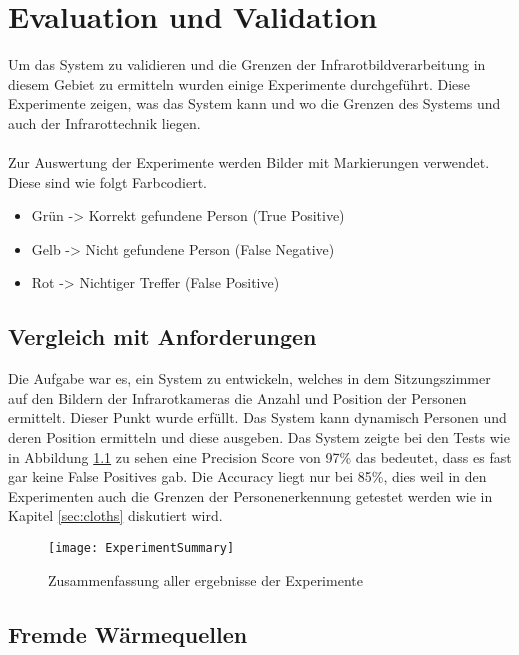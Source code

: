 \chapter{Evaluation und Validation}
\label{ch:Eval}

Um das System zu validieren und die Grenzen der Infrarotbildverarbeitung in diesem Gebiet zu ermitteln wurden einige Experimente durchgeführt. Diese Experimente zeigen, was das System kann und wo die Grenzen des Systems und auch der Infrarottechnik liegen.\\
\\
Zur Auswertung der Experimente werden Bilder mit Markierungen verwendet. Diese sind wie folgt Farbcodiert.

\begin{itemize}
	\item Grün -> Korrekt gefundene Person (True Positive)
	\item Gelb -> Nicht gefundene Person (False Negative)
	\item Rot -> Nichtiger Treffer (False Positive)
\end{itemize}


\section{Vergleich mit Anforderungen}
\label{sec:VergleichAnforderungen}

Die Aufgabe war es, ein System zu entwickeln, welches in dem Sitzungszimmer auf den Bildern der Infrarotkameras die Anzahl und Position der Personen ermittelt. Dieser Punkt wurde erfüllt. Das System kann dynamisch Personen und deren Position ermitteln und diese ausgeben. Das System zeigte bei den Tests wie in Abbildung \ref{fig:ExperimentSummary} zu sehen eine Precision Score von 97\% das bedeutet, dass es fast gar keine False Positives gab. Die Accuracy liegt nur bei 85\%, dies weil in den Experimenten auch die Grenzen der Personenerkennung getestet werden wie in Kapitel \ref{sec:cloths} diskutiert wird.

\begin{figure}[H]
	\centering
	\texttt{[image: ExperimentSummary]}
	\caption{Zusammenfassung aller ergebnisse der Experimente}
	\label{fig:ExperimentSummary}
\end{figure}



\section{Fremde Wärmequellen}
\label{sec:FremdeWärmequellen}

